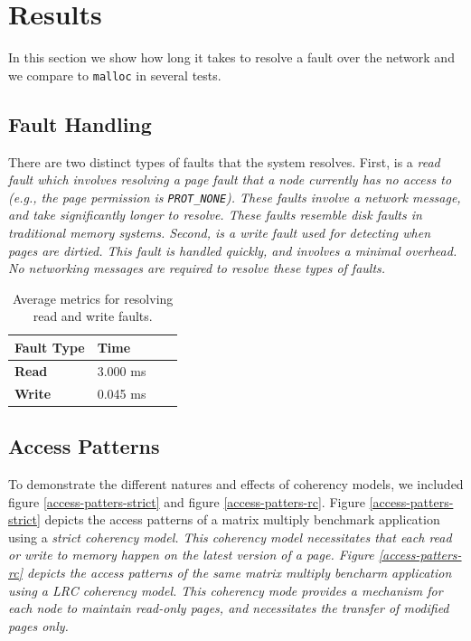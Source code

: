 \section{Results}

In this section we show how long it takes to resolve a fault over the network and we compare \projname{} to \verb,malloc, in several tests.

\subsection{Fault Handling}

There are two distinct types of faults that the \projname{} system resolves.  First, is a \em read \em fault which involves resolving a page fault that a node currently has no access to (e.g., the page permission is \verb,PROT_NONE,).  These faults involve a network message, and take significantly longer to resolve.  These faults resemble disk faults in traditional memory systems.  Second, is a \em write \em fault used for detecting when pages are dirtied.  This fault is handled quickly, and involves a minimal overhead.  No networking messages are required to resolve these types of faults.

\begin{table}[htb]
\centering
\begin{tabular}{|l | l | l | l |}
\hline
\bf{Fault Type} & \bf{Time} \\
\hline
\bf{Read} & 3.000 ms\\
\bf{Write} & 0.045 ms\\
\hline
\end{tabular}
\caption{Average metrics for resolving read and write faults.}
\end{table}

\subsection{Access Patterns}

To demonstrate the different natures and effects of coherency models, we included figure \ref{access-patters-strict} and figure \ref{access-patters-rc}.  Figure \ref{access-patters-strict} depicts the access patterns of a matrix multiply benchmark application using a \em strict \em coherency model.  This coherency model necessitates that each read or write to memory happen on the latest version of a page.  Figure \ref{access-patters-rc} depicts the access patterns of the same matrix multiply bencharm application using a \em LRC \em coherency model.  This coherency mode provides a mechanism for each node to maintain read-only pages, and necessitates the transfer of modified pages only.

